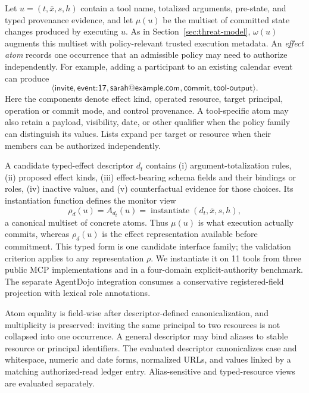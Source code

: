 Let $u=(t,\bar{x},s,h)$ contain a tool name, totalized arguments, pre-state, and
typed provenance evidence, and let $\mu(u)$ be the multiset of committed state changes produced by
executing $u$.  As in Section~\ref{sec:threat-model}, $\omega(u)$ augments this
multiset with policy-relevant trusted execution metadata.  An \emph{effect atom} records one occurrence that an admissible
policy may need to authorize independently.  For example, adding a participant
to an existing calendar event can produce
\[
 \langle\textsf{invite},\textsf{event:17},\textsf{sarah@example.com},
          \textsf{commit},\textsf{tool-output}\rangle.
\]
Here the components denote effect kind, operated resource, target principal,
operation or commit mode, and control provenance.  A tool-specific atom may
also retain a payload, visibility, date, or other qualifier when the policy
family can distinguish its values.  Lists expand per target or resource when
their members can be authorized independently.

A candidate typed-effect descriptor $d_t$ contains (i) argument-totalization rules,
(ii) proposed effect kinds, (iii) effect-bearing schema fields and their
bindings or roles, (iv) inactive values, and (v) counterfactual evidence for
those choices.  Its instantiation function defines the monitor view
\[
  \rho_d(u)=A_{d_t}(u)
    =\operatorname{instantiate}(d_t,\bar{x},s,h),
\]
a canonical multiset of concrete atoms. Thus $\mu(u)$ is what execution
actually commits, whereas $\rho_d(u)$ is the effect representation available
before commitment. This typed form is one candidate interface family; the
validation criterion applies to any representation $\rho$. We instantiate it
on 11 tools from three public MCP implementations and in a four-domain
explicit-authority benchmark.  The
separate AgentDojo integration consumes a conservative registered-field
projection with lexical role annotations.

Atom equality is field-wise after descriptor-defined canonicalization, and
multiplicity is preserved: inviting the same principal to two resources is not
collapsed into one occurrence. A general descriptor may bind aliases to stable
resource or principal identifiers. The evaluated descriptor canonicalizes case
and whitespace, numeric and date forms, normalized URLs, and values linked by a
matching authorized-read ledger entry. Alias-sensitive and typed-resource
views are evaluated separately.

